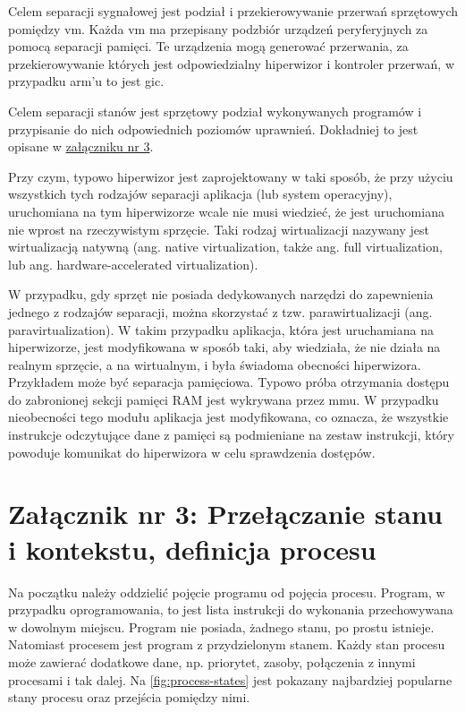 \documentclass[../main]{subfiles}
\begin{document}
Celem separacji sygnałowej jest podział i przekierowywanie przerwań sprzętowych pomiędzy \gls{vm}. Każda \gls{vm} ma przepisany podzbiór urządzeń peryferyjnych za pomocą separacji pamięci. Te urządzenia mogą generować przerwania, za przekierowywanie których jest odpowiedzialny hiperwizor i kontroler przerwań, w przypadku \gls{arm}'u to jest \gls{gic}.

Celem separacji stanów jest sprzętowy podział wykonywanych programów i przypisanie do nich odpowiednich poziomów uprawnień. Dokładniej to jest opisane w \hyperref[sec:zalacznik-3]{załączniku nr 3}.

Przy czym, typowo hiperwizor jest zaprojektowany w taki sposób, że przy użyciu wszystkich tych rodzajów separacji aplikacja (lub system operacyjny), uruchomiana na tym hiperwizorze wcale nie musi wiedzieć, że jest uruchomiana nie wprost na rzeczywistym sprzęcie. Taki rodzaj wirtualizacji nazywany jest wirtualizacją natywną (ang. native virtualization, także ang. full virtualization, lub ang. hardware-accelerated virtualization).

W przypadku, gdy sprzęt nie posiada dedykowanych narzędzi do zapewnienia jednego z rodzajów separacji, można skorzystać z tzw. parawirtualizacji (ang. paravirtualization). W takim przypadku aplikacja, która jest uruchamiana na hiperwizorze, jest modyfikowana w sposób taki, aby wiedziała, że nie działa na realnym sprzęcie, a na wirtualnym, i była świadoma obecności hiperwizora. Przykładem może być separacja pamięciowa. Typowo próba otrzymania dostępu do zabronionej sekcji pamięci RAM jest wykrywana przez \gls{mmu}. W przypadku nieobecności tego modułu aplikacja jest modyfikowana, co oznacza, że wszystkie instrukcje odczytujące dane z pamięci są podmieniane na zestaw instrukcji, który powoduje komunikat do hiperwizora w celu sprawdzenia dostępów. 

\section*{Załącznik nr 3: Przełączanie stanu i kontekstu, definicja procesu}\label{sec:zalacznik-3}

Na początku należy oddzielić pojęcie programu od pojęcia procesu. Program, w przypadku oprogramowania, to jest lista instrukcji do wykonania przechowywana w dowolnym miejscu. Program nie posiada, żadnego stanu, po prostu istnieje. Natomiast procesem jest program z przydzielonym stanem. Każdy stan procesu może zawierać dodatkowe dane, np. priorytet, zasoby, połączenia z innymi procesami i tak dalej. Na \cref{fig:process-states} jest pokazany najbardziej popularne stany procesu oraz przejścia pomiędzy nimi.
\end{document}
